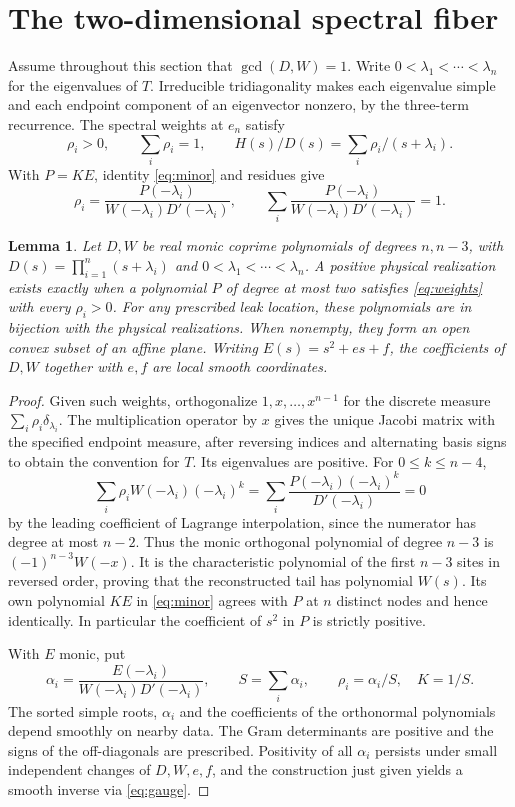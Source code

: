\documentclass[11pt,a4paper]{article}
\newtheorem{lemma}[theorem]{Lemma}
\begin{document}
\section{The two-dimensional spectral fiber}
Assume throughout this section that \(\gcd(D,W)=1\). Write
\(0<\lambda_1<\cdots<\lambda_n\) for the eigenvalues of \(T\). Irreducible
tridiagonality makes each eigenvalue simple and each endpoint component of
an eigenvector nonzero, by the three-term recurrence. The spectral weights
at \(e_n\) satisfy
\[
 \rho_i>0,\qquad \sum_i\rho_i=1,\qquad
 H(s)/D(s)=\sum_i \rho_i/(s+\lambda_i).
\]
With \(P=K E\), identity \eqref{eq:minor} and residues give
\begin{equation}\label{eq:weights}
 \rho_i=\frac{P(-\lambda_i)}{W(-\lambda_i)D'(-\lambda_i)},\qquad
 \sum_i\frac{P(-\lambda_i)}{W(-\lambda_i)D'(-\lambda_i)}=1 .
\end{equation}
\begin{lemma}\label{lem:coords}
Let \(D,W\) be real monic coprime polynomials of degrees \(n,n-3\), with
\(D(s)=\prod_{i=1}^n(s+\lambda_i)\) and \(0<\lambda_1<\cdots<\lambda_n\).
A positive physical realization exists exactly when a polynomial \(P\) of
degree at most two satisfies \eqref{eq:weights} with every \(\rho_i>0\).
For any prescribed leak location, these polynomials are in bijection with
the physical realizations. When nonempty, they form an open convex subset
of an affine plane. Writing \(E(s)=s^2+es+f\), the coefficients
of \(D,W\) together with \(e,f\) are local smooth coordinates.
\end{lemma}
\begin{proof}
Given such weights, orthogonalize \(1,x,\ldots,x^{n-1}\) for the discrete
measure \(\sum_i\rho_i\delta_{\lambda_i}\). The multiplication operator by
\(x\) gives the unique Jacobi matrix with the specified endpoint measure,
after reversing indices and alternating basis signs to obtain the convention
for \(T\). Its eigenvalues are positive. For \(0\le k\le n-4\),
\[
 \sum_i\rho_i W(-\lambda_i)(-\lambda_i)^k
   =\sum_i\frac{P(-\lambda_i)(-\lambda_i)^k}{D'(-\lambda_i)}=0
\]
by the leading coefficient of Lagrange interpolation, since the numerator
has degree at most \(n-2\). Thus the monic orthogonal polynomial of degree
\(n-3\) is \((-1)^{n-3}W(-x)\). It is the characteristic polynomial of the
first \(n-3\) sites in reversed order, proving that the reconstructed tail
has polynomial \(W(s)\). Its own polynomial \(K E\) in \eqref{eq:minor}
agrees with \(P\) at \(n\) distinct nodes and hence identically. In
particular the coefficient of \(s^2\) in \(P\) is strictly positive.

With \(E\) monic, put
\begin{equation}\label{eq:alpha}
 \alpha_i=\frac{E(-\lambda_i)}{W(-\lambda_i)D'(-\lambda_i)},\qquad
 S=\sum_i\alpha_i,\qquad \rho_i=\alpha_i/S,\quad K=1/S.
\end{equation}
The sorted simple roots, \(\alpha_i\) and the coefficients of the
orthonormal polynomials depend smoothly on nearby data. The Gram determinants
are positive and the signs of the off-diagonals are prescribed. Positivity
of all \(\alpha_i\) persists under small independent changes of \(D,W,e,f\),
and the construction just given yields a smooth inverse via \eqref{eq:gauge}.
\end{proof}
\end{document}
